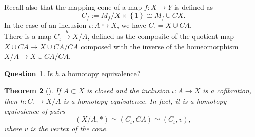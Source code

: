 \documentclass[reqno]{amsart}
\newtheorem{theorem}{Theorem}[section]
\theoremstyle{definition}
\newtheorem{question}[theorem]{Question}
\theoremstyle{remark}
\begin{document}
Recall also that the mapping cone of a
map $f \colon X \to Y$ is defined as
\[
C_f := M_f / X \times \left\{ 1 \right\} 
\cong M_f \cup CX.
\] 
In the case of an inclusion
$\iota \colon A \hookrightarrow X$, we have
$C_{\iota} = X \cup  CA$.\\
There is a map
$C_{\iota} \stackrel{h}{\to} X / A$, defined
as the composite of the quotient map
$X \cup  CA \to X \cup  CA /CA$ composed with the
inverse of the homeomorphism $X / A \to 
X \cup  CA /CA$.

\begin{question}
    Is $h$ a homotopy equivalence?
\end{question}

\begin{theorem}[]\label{Thm:2030akKAK}
    If $A \subset X$ is closed and the inclusion
    $\iota \colon A \to X$ is a cofibration, then
    $h \colon C_{\iota} \to X /A$ is a homotopy equivalence.
    In fact, it is a homotopy equivalence of pairs
    \[
        \left( X /A, * \right) \simeq
        \left( C_{\iota}, CA \right) \simeq
        \left( C_{\iota}, v \right) ,
    \] 
    where $v$ is the vertex of the cone.
\end{theorem}
\end{document}
